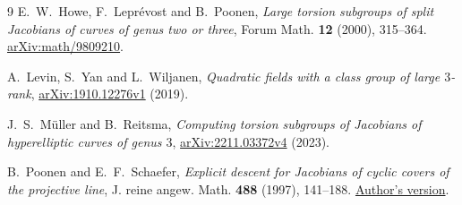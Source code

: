 \documentclass[11pt,reqno]{amsart}
\theoremstyle{remark}
\begin{document}
\begin{thebibliography}{9}
E.~W.~Howe, F.~Lepr\'evost and B.~Poonen,
\emph{Large torsion subgroups of split Jacobians of curves of genus two or three},
Forum Math. \textbf{12} (2000), 315--364.
\href{https://arxiv.org/abs/math/9809210}{arXiv:math/9809210}.

A.~Levin, S.~Yan and L.~Wiljanen,
\emph{Quadratic fields with a class group of large \(3\)-rank},
\href{https://arxiv.org/abs/1910.12276v1}{arXiv:1910.12276v1} (2019).

J.~S.~M\"uller and B.~Reitsma,
\emph{Computing torsion subgroups of Jacobians of hyperelliptic curves of genus \(3\)},
\href{https://arxiv.org/abs/2211.03372v4}{arXiv:2211.03372v4} (2023).

B.~Poonen and E.~F.~Schaefer,
\emph{Explicit descent for Jacobians of cyclic covers of the projective line},
J. reine angew. Math. \textbf{488} (1997), 141--188.
\href{https://math.mit.edu/~poonen/papers/descent.pdf}{Author's version}.
\end{thebibliography}
\end{document}
